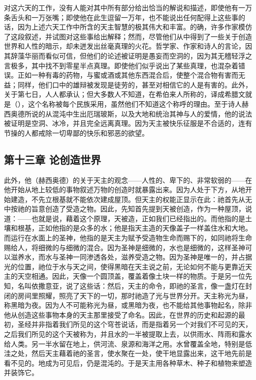对这六天的工作，没有人能对其中所有部分给出恰当的解说和描述，即使他有一万条舌头和一万张嘴；即使他在此生逗留一万年，也不能说出任何配得上这些事的话，因为上述六天工作中所含的天主智慧的极其伟大和丰富。的确，许多作家模仿了这段叙述，并试图对这些事给出解释；然而，尽管他们从中得到了一些关于创造世界和人性的暗示，却未迸发出丝毫真理的火花。哲学家、作家和诗人的言论，因其辞藻华丽而看似可信，但他们的论述被证明是愚妄而空洞的，因为其无稽轻浮之言极多，其中找不到零星半点真理。即使他们似乎说出了某些真理，也混杂着错误。正如一种有毒的药物，与蜜或酒或其他东西混合后，使整个混合物有害而无益；同样，他们口中的雄辩被发现是徒劳的，甚至对相信它的人是有害的。此外，关于第七日，人人都承认；但大多数人不知道，在希伯来人所称的，译成希腊文就是（），这个名称被每个民族采用，虽然他们不知道这个称呼的理由。至于诗人赫西奥德所说的从混沌中生出厄瑞玻斯，以及大地和统治其神与人的爱情，他的说法被证明是空洞、冰冷，并且完全远离真理。因为天主被快乐征服是不合适的，连有节操的人都戒除一切卑鄙的快乐和邪恶的欲望。\par


\subsection{第十三章 论创造世界}

此外，他（赫西奥德）的关于天主的观念——人性的、卑下的、非常软弱的——在他开始从地上较低的事物叙述万物的创造时就暴露出来。因为人处于下方，从地开始建造，不先立根基就不能依次建成屋顶。但天主的权能正显示在此：祂首先从无中按祂的旨意创造了受造之物。因此，先知首先提到天被创造，作为一种屋顶，说道：——也就是说，藉着这个原理，天被造，正如我们已经指出的。而他指的是土壤和根基，正如他指的是众多的水；他是指天主造的天像盖子一样盖住水和大地。而运行在水面上的圣神，他指的是天主为赋予受造物生命而赐下的，如同祂将生命赐给人，将细微的与细微的混合。因为圣神是细微的，水也是细微的，这样圣神可以滋养水，而水与圣神一同渗透各处，滋养受造之物。因为圣神是唯一的，并占据光的位置，祂位于水与天之间，使得黑暗在天主说之前，无论如何不能与更靠近天主的天空相通。因此，天像一个圆顶盖，覆盖着像土块一样的物质。于是另一位先知，名叫依撒意亚，说了这些话：然后，天主的命令，即祂的圣言，像一盏灯在封闭的房间里照耀，照亮了天下的一切，那时祂造了光与世界分开。天主称光为昼，称黑暗为夜。因为人不可能称光为昼，或黑暗为夜，也不能给其他事物起名，除非他从创造这些事物本身的天主那里接受了命名。因此，在世界的历史和起源的最初，圣经并非指着我们所见的这个穹苍说话，而是指着另一个对我们不可见的天，之后我们所见的这个天被称为，并且水的一半被提取上去，以供雨水、阵雨和露水给人类。另一半水留在地上，供河流、泉源和海洋之用。水曾覆盖全地，特别是低洼之处，然后天主藉着祂的圣言，使水聚在一处，使干地显露出来，这干地先前是看不见的。地成为可见后，仍是混沌的。于是天主用各种草木、种子和植物来塑造并装饰它。\par

